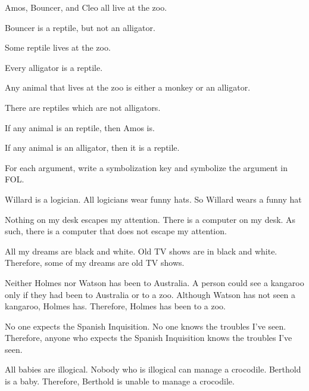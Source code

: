 \begin{earg}
\item Amos, Bouncer, and Cleo all live at the zoo.
\item Bouncer is a reptile, but not an alligator.
\item Some reptile lives at the zoo.
\item Every alligator is a reptile.
\item Any animal that lives at the zoo is either a monkey or an alligator.
\item There are reptiles which are not alligators.
\item If any animal is an reptile, then Amos is.
\item If any animal is an alligator, then it is a reptile.
\end{earg}

\problempart
\label{pr.FOLarguments}
For each argument, write a symbolization key and symbolize the argument in FOL.
\begin{earg}
\item Willard is a logician. All logicians wear funny hats. So Willard wears a funny hat
\item Nothing on my desk escapes my attention. There is a computer on my desk. As such, there is a computer that does not escape my attention.
\item All my dreams are black and white. Old TV shows are in black and white. Therefore, some of my dreams are old TV shows.
\item Neither Holmes nor Watson has been to Australia. A person could see a kangaroo only if they had been to Australia or to a zoo. Although Watson has not seen a kangaroo, Holmes has. Therefore, Holmes has been to a zoo.
\item No one expects the Spanish Inquisition. No one knows the troubles I've seen. Therefore, anyone who expects the Spanish Inquisition knows the troubles I've seen.
\item All babies are illogical. Nobody who is illogical can manage a crocodile. Berthold is a baby. Therefore, Berthold is unable to manage a crocodile.
\end{earg}


